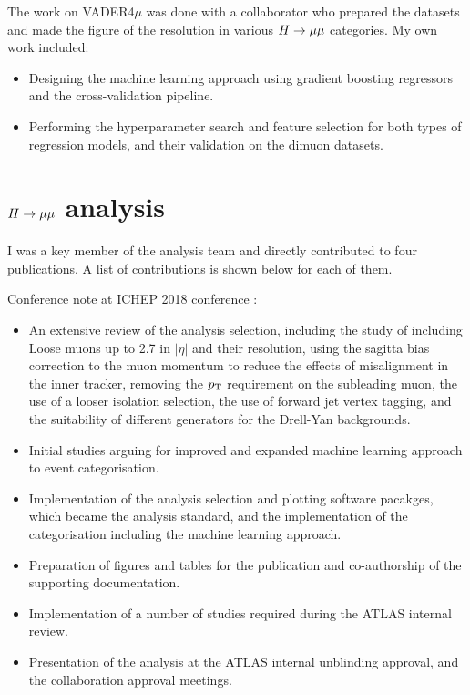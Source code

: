 \noindent The work on VADER4$\mu$ was done with a collaborator who
prepared the datasets and made the figure of the resolution
in various $H \rightarrow \mu\mu$ categories. My own work included:
\begin{itemize}
\item Designing the machine learning approach using 
gradient boosting regressors and the cross-validation
pipeline.
\item Performing the hyperparameter search and feature
selection for both types of regression models, and
their validation on the dimuon datasets.
\end{itemize}

\section*{$H \rightarrow \mu\mu$ analysis}

I was a key member of the analysis team and directly
contributed to four publications. A list of contributions
is shown below for each of them.

\noindent Conference note at ICHEP 2018 conference \cite{ATLAS-CONF-2018-026}:
\begin{itemize}
\item An extensive review of the analysis selection, including the study
of including Loose muons up to 2.7 in $|\eta|$ and their resolution,
using the sagitta bias correction to the muon momentum to reduce
the effects of misalignment in the inner tracker, removing the $p_{\text{T}}$
requirement on the subleading muon, the use of a looser isolation
selection, the use of forward jet vertex tagging, and the suitability
of different generators for the Drell-Yan backgrounds.
\item Initial studies arguing for improved and expanded machine
learning approach to event categorisation.
\item Implementation of the analysis selection and plotting software
pacakges, which became the analysis standard, and the implementation
of the categorisation including the machine learning approach.
\item Preparation of figures and tables for the publication and
co-authorship of the supporting documentation.
\item Implementation of a number of studies required during the
ATLAS internal review.
\item Presentation of the analysis at the ATLAS internal unblinding
approval, and the collaboration approval meetings.
\end{itemize}

